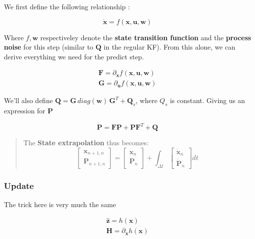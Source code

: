 \documentclass[12pt]{article}
\begin{document}
We first define the following relationship :

\[\boldsymbol{\dot{x}} = f(\boldsymbol x, \boldsymbol u, \boldsymbol w)\]

Where \(f, \boldsymbol{w}\) respectiveley denote the \textbf{state
transition function} and the \textbf{process noise} for this step
(similar to \(\boldsymbol Q\) in the regular KF). From this alone, we
can derive everything we need for the predict step.

\[\begin{matrix}
{\boldsymbol F} = \partial_{\boldsymbol x} f({\boldsymbol x}, {\boldsymbol u}, {\boldsymbol w}) \\ {\boldsymbol G} = \partial_{\boldsymbol u} f({\boldsymbol x}, {\boldsymbol u}, {\boldsymbol w})
\end{matrix}\]

We'll also define
\(\boldsymbol Q = \boldsymbol G \, diag(\boldsymbol w) \, \boldsymbol G^T + \boldsymbol Q_s\),
where \(Q_s\) is constant. Giving us an expression for \(\boldsymbol P\)

\[\boldsymbol{\dot{P}} = \boldsymbol F \boldsymbol P + \boldsymbol P \boldsymbol F^T + \boldsymbol Q\]

\begin{quote}
The \textbf{State extrapolation} thus becomes: \[\begin{bmatrix}
\boldsymbol x_{n+1,n}\\
\boldsymbol P_{n+1,n}
\end{bmatrix} = 
\begin{bmatrix}
\boldsymbol x_{n}\\
\boldsymbol P_{n}
\end{bmatrix} +
\int_{\Delta t}
\begin{bmatrix}
\boldsymbol{\dot x}_{n}\\
\boldsymbol{\dot P}_{n}
\end{bmatrix} dt
\]
\end{quote}

\subsubsection{Update}\label{update}

The trick here is very much the same

\[\begin{matrix}
\boldsymbol{\hat z} = h(\boldsymbol x) \\
\boldsymbol H = \partial_{\boldsymbol x}h(\boldsymbol x)
\end{matrix}\]
\end{document}
